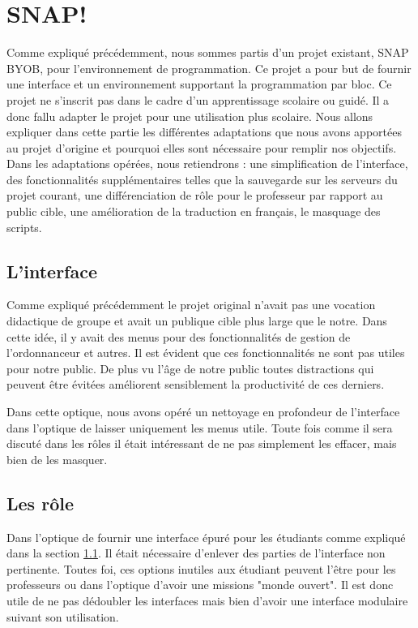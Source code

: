 \section{SNAP!}
\label{solution SNAP}
Comme expliqué précédemment, nous sommes partis d'un projet existant, SNAP BYOB, pour l'environnement de programmation. Ce projet a pour but de fournir une interface et un environnement supportant la programmation par bloc. Ce projet ne s'inscrit pas dans le cadre d'un apprentissage scolaire ou guidé. Il a donc fallu adapter le projet pour une utilisation plus scolaire. Nous allons expliquer dans cette partie les différentes adaptations que nous avons apportées au projet d'origine et pourquoi elles sont nécessaire pour remplir nos objectifs.\\

Dans les adaptations opérées, nous retiendrons : une simplification de l'interface, des fonctionnalités supplémentaires telles que la sauvegarde sur les serveurs du projet courant, une différenciation de rôle pour le professeur par rapport au public cible, une amélioration de la traduction en français, le masquage des scripts.

\subsection{L'interface}
\label{interface}
Comme expliqué précédemment le projet original n'avait pas une vocation didactique de groupe et avait un publique cible plus large que le notre. Dans cette idée, il y avait des menus pour des fonctionnalités de gestion de l'ordonnanceur et autres. Il est évident que ces fonctionnalités ne sont pas utiles pour notre public. De plus vu l'âge de notre public toutes distractions qui peuvent être évitées améliorent sensiblement la productivité de ces derniers.

Dans cette optique, nous avons opéré un nettoyage en profondeur de l'interface dans l'optique de laisser uniquement les menus utile. Toute fois comme il sera discuté dans les rôles il était intéressant de ne pas simplement les effacer, mais bien de les masquer.

\subsection{Les rôle}
\label{role}
Dans l'optique de fournir une interface épuré pour les étudiants comme expliqué dans la section \ref{interface}. Il était nécessaire d'enlever des parties de l'interface non pertinente. Toutes foi, ces options inutiles aux étudiant peuvent l'être pour les professeurs ou dans l'optique d'avoir une missions "monde ouvert". Il est donc utile de ne pas dédoubler les interfaces mais bien d'avoir une interface modulaire suivant son utilisation. \\

